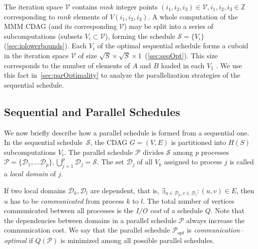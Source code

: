 \documentclass[sigplan,review,anonymous,10pt]{acmart}\settopmatter{printfolios=true,printccs=false,printacmref=false}
\newcommand\mac[1]{\textcolor{red}{[Mac: #1]}}
\begin{document}
The iteration space $\mathcal{V}$ contains $mnk$ integer points \linebreak
$(i_1,i_2,i_3) \in \mathcal{V}, i_1,i_2,i_3 \in \mathbb{Z}$ corresponding to 
$mnk$
elements of $V(i_1,i_2,i_3)$.  A whole computation of the MMM CDAG (and its
corresponding  $\mathcal{V}$) may be split into a series of subcomputations
(subsets $V_i \subset \mathcal{V}$), forming the schedule
$\mathcal{S} = \{V_i\}$ (\cref{sec:iolowerbounds}). Each $V_i$ of the optimal 
sequential schedule forms a cuboid in the iteration space $\mathcal{V}$ of 
size $\sqrt{S} \times \sqrt{S} \times 1$~(\cref{sec:seqOpt}). This size 
corresponds to the number of 
elements of $A$ and $B$ loaded in each $V_1$ . We use this 
fact in~\cref{sec:parOptimality} to analyze the parallelization strategies of 
the sequential schedule.



\subsection{Sequential and Parallel Schedules}
\label{sec:seqpar}

We now briefly describe how a parallel schedule is formed from a sequential 
one. In the sequential
schedule~$\mathcal{S}$, the CDAG $G = (V,E)$ is partitioned into $H(S)$
subcomputations $V_i$. The parallel schedule $\mathcal{P}$ divides
$\mathcal{S}$ among $p$ processes $\mathcal{P} = \{\mathcal{D}_1, \dots
\mathcal{D}_p\}, \bigcup_{j=1}^p \mathcal{D}_j = \mathcal{S}$. The set
$\mathcal{D}_j$ of all $V_k$ assigned to process $j$ is called a \emph{local
domain} of $j$.

If two local domains $\mathcal{D}_k, \mathcal{D}_l$ are dependent, that is,
\linebreak $\exists_{u \in \mathcal{D}_k, v \in \mathcal{D}_l} : (u,v) \in E$,
then $u$ has to be \emph{communicated} from process $k$ to $l$. The total
number of vertices communicated between all processes is the \emph{I/O cost} of
a schedule $Q$.  Note that the dependencies between domains in a parallel
schedule $\mathcal{P}$ always increase the communication cost.
 We say that the parallel schedule
$\mathcal{P}_{opt}$ is
\emph{communication--optimal} if $Q(\mathcal{P})$ is minimized among all
possible parallel schedules. 
\end{document}
